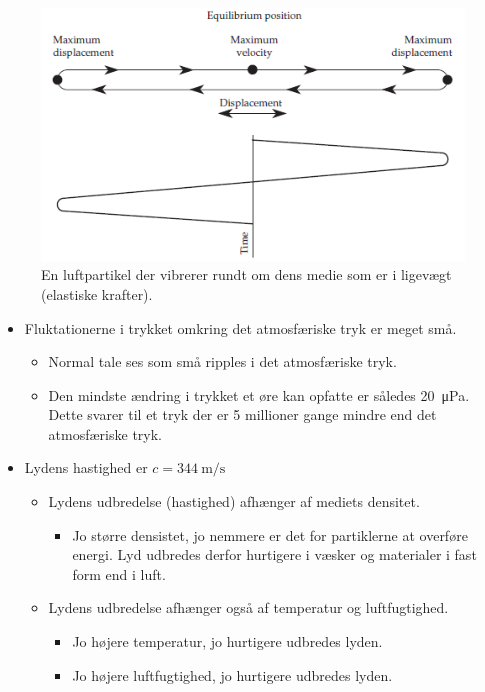 \begin{figure} [H]
	\centering
	\includegraphics[width=0.85\linewidth]{graphics/1.png}
	\caption{En luftpartikel der vibrerer rundt om dens medie som er i ligevægt (elastiske krafter).}
	\label{fig:1}
\end{figure}

\begin{itemize}
	\item Fluktationerne i trykket omkring det atmosfæriske tryk er meget små.
	\begin{itemize}
		\item Normal tale ses som små ripples i det atmosfæriske tryk.
		\item Den mindste ændring i trykket et øre kan opfatte er således \SI{20}{\micro\pascal}. Dette svarer til et tryk der er 5 millioner gange mindre end det atmosfæriske tryk.
	\end{itemize}
	\item Lydens hastighed er $c = \SI{344}{\meter\per\second}$
	\begin{itemize}
		\item Lydens udbredelse (hastighed) afhænger af mediets densitet.
		\begin{itemize}
			\item Jo større densistet, jo nemmere er det for partiklerne at overføre energi. Lyd udbredes derfor hurtigere i væsker og materialer i fast form end i luft.
		\end{itemize}
		\item Lydens udbredelse afhænger også af temperatur og luftfugtighed.
		\begin{itemize}
			\item Jo højere temperatur, jo hurtigere udbredes lyden. 
			\item Jo højere luftfugtighed, jo hurtigere udbredes lyden.
		\end{itemize} 
	\end{itemize}
\end{itemize}

